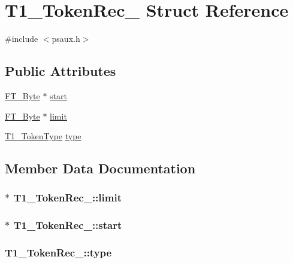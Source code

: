 \hypertarget{struct_t1___token_rec__}{\section{T1\-\_\-\-Token\-Rec\-\_\- Struct Reference}
\label{struct_t1___token_rec__}
}


{\ttfamily \#include $<$psaux.\-h$>$}

\subsection*{Public Attributes}
\begin{DoxyCompactItemize}
\item 
\hyperlink{fttypes_8h_a51f26183ca0c9f4af958939648caeccd}{F\-T\-\_\-\-Byte} $\ast$ \hyperlink{struct_t1___token_rec___a1b365e2910220eabf05f925f45bc98d6}{start}
\item 
\hyperlink{fttypes_8h_a51f26183ca0c9f4af958939648caeccd}{F\-T\-\_\-\-Byte} $\ast$ \hyperlink{struct_t1___token_rec___aacd035f0dfbc47b7e1c7eefbe2c2080c}{limit}
\item 
\hyperlink{psaux_8h_a6c524c7d74034e1dc206cfb5587069d4}{T1\-\_\-\-Token\-Type} \hyperlink{struct_t1___token_rec___a88b3b889e74609be1827ead4093a2d52}{type}
\end{DoxyCompactItemize}


\subsection{Member Data Documentation}
\hypertarget{struct_t1___token_rec___aacd035f0dfbc47b7e1c7eefbe2c2080c}{
\subsubsection[{limit}]{$\ast$ T1\-\_\-\-Token\-Rec\-\_\-\-::limit}}\label{struct_t1___token_rec___aacd035f0dfbc47b7e1c7eefbe2c2080c}
\hypertarget{struct_t1___token_rec___a1b365e2910220eabf05f925f45bc98d6}{
\subsubsection[{start}]{$\ast$ T1\-\_\-\-Token\-Rec\-\_\-\-::start}}\label{struct_t1___token_rec___a1b365e2910220eabf05f925f45bc98d6}
\hypertarget{struct_t1___token_rec___a88b3b889e74609be1827ead4093a2d52}{
\subsubsection[{type}]{ T1\-\_\-\-Token\-Rec\-\_\-\-::type}}\label{struct_t1___token_rec___a88b3b889e74609be1827ead4093a2d52}


